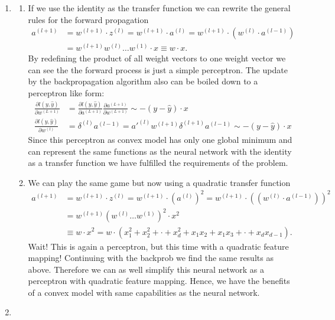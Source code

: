 \documentclass[12pt]{article}
\begin{document}
\begin{enumerate}
	\item 
	\begin{enumerate}[label=(\alph*)]
		\item If we use the identity as the transfer function we can rewrite the general rules for the forward propagation
		\begin{align}
			a^{(l+1)} &= w^{(l+1)}\cdot z^{(l)} = w^{(l+1)}\cdot a^{(l)} = w^{(l+1)}\cdot (w^{(l)}\cdot a^{(l-1)}) \\
			&= w^{(l+1)}w^{(l)}\dots w^{(1)}\cdot x \equiv w\cdot x.
		\end{align}
		By redefining the product of all weight vectors to one weight vector we can see the the forward process is just a simple perceptron. The update by the backpropagation algorithm also can be boiled down to a perceptron like form:
		\begin{align}
		\frac{\partial l(y,\hat{y})}{\partial w^{(L+1)}}&= \frac{\partial l(y,\hat{y})}{\partial a^{(L+1)}}\frac{\partial a^{(L+1)}}{\partial w^{(L+1)}} \sim - ( y - \hat{y} )\cdot x \\
		\frac{\partial l(y,\hat{y})}{\partial w^{(l)}} &= \delta^{(l)} a^{(l-1)} = a'^{(l)}w^{(l+1)}\delta^{(l+1)}a^{(l-1)} \sim - ( y - \hat{y} )\cdot x
		\end{align}
		Since this perceptron as convex model has only one global minimum and can represent the same functions as the neural network with the identity as a transfer function we have fulfilled the requirements of the problem. 
		\item 
		We can play the same game but now using a quadratic transfer function
		\begin{align}
		a^{(l+1)} &= w^{(l+1)}\cdot z^{(l)} = w^{(l+1)}\cdot (a^{(l)})^2 = w^{(l+1)}\cdot ((w^{(l)}\cdot a^{(l-1)}))^2 \\
		&= w^{(l+1)}(w^{(l)}\dots w^{(1)})^2\cdot x^2 \\
		&\equiv w\cdot x^2 = w\cdot (x_1^2 + x_2^2 + \cdot + x_d^2 + x_1x_2 + x_1x_3 + \cdot +  x_dx_{d-1}).
		\end{align}
		Wait! This is again a perceptron, but this time with a quadratic feature mapping! Continuing with the backprob we find the same results as above. Therefore we can as well simplify this neural network as a perceptron with quadratic feature mapping. Hence, we have the benefits of a convex model with same capabilities as the neural network.
	\end{enumerate}
	\item

\end{enumerate}
\end{document}
